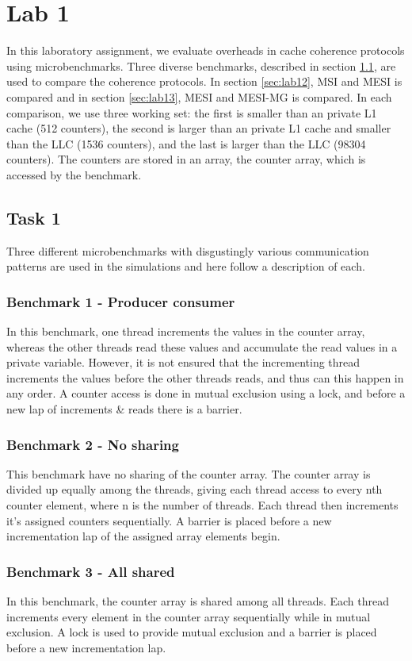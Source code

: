 \section{Lab 1}
\label{sec:lab1}
In this laboratory assignment, we evaluate overheads in cache coherence protocols using microbenchmarks. Three diverse benchmarks, described in section \ref{sec:lab11}, are used to compare the coherence protocols. In section \ref{sec:lab12}, MSI and MESI is compared and in section \ref{sec:lab13}, MESI and MESI-MG is compared. In each comparison, we use three working set: the first is smaller than an private L1 cache (512 counters), the second is larger than an private L1 cache and smaller than the LLC (1536 counters), and the last is larger than the LLC (98304 counters). The counters are stored in an array, the counter array, which is accessed by the benchmark.

\subsection{Task 1}
\label{sec:lab11}
Three different microbenchmarks with disgustingly various communication patterns are used in the simulations and here follow a description of each.
\subsubsection*{Benchmark 1 - Producer consumer}
In this benchmark, one thread increments the values in the counter array, whereas the other threads read these values and accumulate the read values in a private variable. However, it is not ensured that the incrementing thread increments the values before the other threads reads, and thus can this happen in any order. A counter access is done in mutual exclusion using a lock, and before a new lap of increments \& reads there is a barrier.

\subsubsection*{Benchmark 2 - No sharing}
This benchmark have no sharing of the counter array. The counter array is divided up equally among the threads, giving each thread access to every nth counter element, where n is the number of threads. Each thread then increments it's assigned counters sequentially. A barrier is placed before a new incrementation lap of the assigned array elements begin. 

\subsubsection*{Benchmark 3 - All shared}
In this benchmark, the counter array is shared among all threads. Each thread increments every element in the counter array sequentially while in mutual exclusion. A lock is used to provide mutual exclusion and a barrier is placed before a new incrementation lap. 

